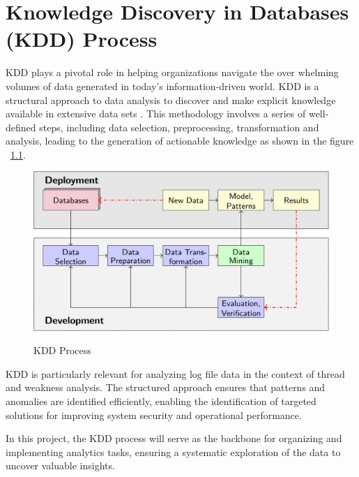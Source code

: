 %
%

\chapter{Knowledge Discovery in Databases (KDD) Process}

KDD plays a pivotal role in helping organizations navigate the over whelming volumes of data generated in today’s information-driven world. KDD is a structural approach to data analysis to discover and make explicit knowledge available in extensive data sets \cite{Wings:2024}. This methodology involves a series of well-defined steps, including data selection, preprocessing, transformation and analysis, leading to the generation of actionable knowledge as shown in the figure ~\ref{KDD Process}. \cite{KDD:2000}

\begin{figure}
	\begin{center}
		\includegraphics[width=0.7\linewidth]{Images/KDD.png}
		\caption{KDD Process}
		\label{KDD Process} 
		\cite{Wings:2024}
	\end{center}
\end{figure}

KDD is particularly relevant for analyzing log file data in the context of thread and weakness analysis. The structured approach ensures that patterns and anomalies are identified efficiently, enabling the identification of targeted solutions for improving system security and operational performance. \cite{IEEE:1997}

In this project, the KDD process will serve as the backbone for organizing and implementing analytics tasks, ensuring a systematic exploration of the data to uncover valuable insights.

